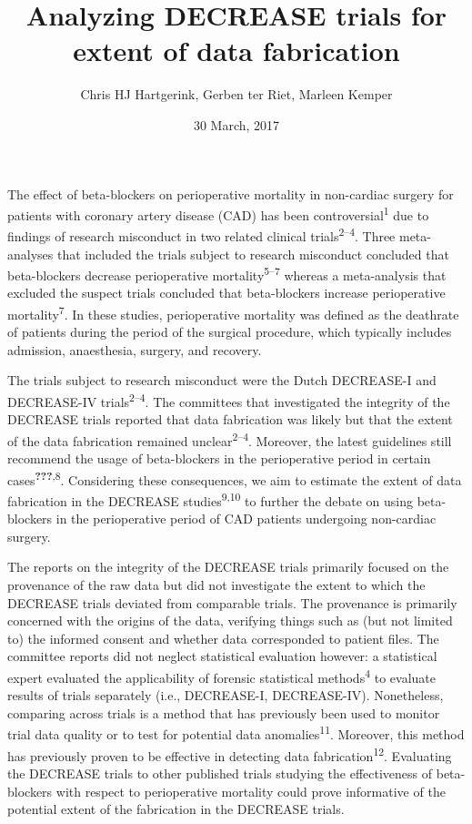 \documentclass[]{article}
\title{Analyzing DECREASE trials for extent of data fabrication}
\author{Chris HJ Hartgerink, Gerben ter Riet, Marleen Kemper}
\date{30 March, 2017}
\begin{document}
\maketitle

The effect of beta-blockers on perioperative mortality in non-cardiac
surgery for patients with coronary artery disease (CAD) has been
controversial\textsuperscript{1} due to findings of research misconduct
in two related clinical trials\textsuperscript{2--4}. Three
meta-analyses that included the trials subject to research misconduct
concluded that beta-blockers decrease perioperative
mortality\textsuperscript{5--7} whereas a meta-analysis that excluded
the suspect trials concluded that beta-blockers increase perioperative
mortality\textsuperscript{7}. In these studies, perioperative mortality
was defined as the deathrate of patients during the period of the
surgical procedure, which typically includes admission, anaesthesia,
surgery, and recovery.

The trials subject to research misconduct were the Dutch DECREASE-I and
DECREASE-IV trials\textsuperscript{2--4}. The committees that
investigated the integrity of the DECREASE trials reported that data
fabrication was likely but that the extent of the data fabrication
remained unclear\textsuperscript{2--4}. Moreover, the latest guidelines
still recommend the usage of beta-blockers in the perioperative period
in certain cases\textsuperscript{{\textbf{???}},8}. Considering these
consequences, we aim to estimate the extent of data fabrication in the
DECREASE studies\textsuperscript{9,10} to further the debate on using
beta-blockers in the perioperative period of CAD patients undergoing
non-cardiac surgery.

The reports on the integrity of the DECREASE trials primarily focused on
the provenance of the raw data but did not investigate the extent to
which the DECREASE trials deviated from comparable trials. The
provenance is primarily concerned with the origins of the data,
verifying things such as (but not limited to) the informed consent and
whether data corresponded to patient files. The committee reports did
not neglect statistical evaluation however: a statistical expert
evaluated the applicability of forensic statistical
methods\textsuperscript{4} to evaluate results of trials separately
(i.e., DECREASE-I, DECREASE-IV). Nonetheless, comparing across trials is
a method that has previously been used to monitor trial data quality or
to test for potential data anomalies\textsuperscript{11}. Moreover, this
method has previously proven to be effective in detecting data
fabrication\textsuperscript{12}. Evaluating the DECREASE trials to other
published trials studying the effectiveness of beta-blockers with
respect to perioperative mortality could prove informative of the
potential extent of the fabrication in the DECREASE trials.
\end{document}
